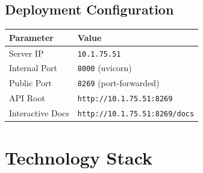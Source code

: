 \documentclass[12pt,a4paper]{article}
\begin{document}
\subsection{Deployment Configuration}
\begin{center}
\begin{tabular}{ll}
    \toprule
    \textbf{Parameter} & \textbf{Value} \\
    \midrule
    Server IP           & \texttt{10.1.75.51} \\
    Internal Port       & \texttt{8000} (uvicorn) \\
    Public Port         & \texttt{8269} (port-forwarded) \\
    API Root            & \texttt{http://10.1.75.51:8269} \\
    Interactive Docs    & \texttt{http://10.1.75.51:8269/docs} \\
    \bottomrule
\end{tabular}
\end{center}

\section{Technology Stack}
\end{document}
